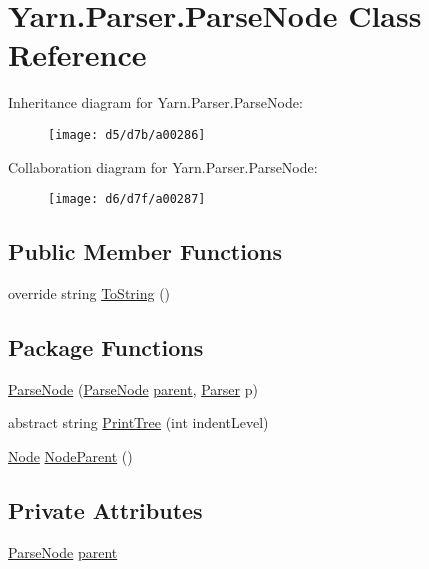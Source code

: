 \hypertarget{a00063}{\section{Yarn.\-Parser.\-Parse\-Node Class Reference}
\label{a00063}
}


Inheritance diagram for Yarn.\-Parser.\-Parse\-Node\-:
\nopagebreak
\begin{figure}[H]
\begin{center}
\leavevmode
\texttt{[image: d5/d7b/a00286]}
\end{center}
\end{figure}


Collaboration diagram for Yarn.\-Parser.\-Parse\-Node\-:
\nopagebreak
\begin{figure}[H]
\begin{center}
\leavevmode
\texttt{[image: d6/d7f/a00287]}
\end{center}
\end{figure}
\subsection*{Public Member Functions}
\begin{DoxyCompactItemize}
\item 
override string \hyperlink{a00063_a18c67cb16090d0889bb9d6c8c6c565f8}{To\-String} ()
\end{DoxyCompactItemize}
\subsection*{Package Functions}
\begin{DoxyCompactItemize}
\item 
\hyperlink{a00063_a9e7e90bbaed268529230512e4b5a2f77}{Parse\-Node} (\hyperlink{a00063}{Parse\-Node} \hyperlink{a00063_af313a82103fcc2ff5a177dbb06b92f7b}{parent}, \hyperlink{a00064}{Parser} p)
\item 
abstract string \hyperlink{a00063_a0d6611653f20c2e4d90a97a96c657137}{Print\-Tree} (int indent\-Level)
\item 
\hyperlink{a00054}{Node} \hyperlink{a00063_a580e520a29444fc23ac3660cbe514a09}{Node\-Parent} ()
\end{DoxyCompactItemize}
\subsection*{Private Attributes}
\begin{DoxyCompactItemize}
\item 
\hyperlink{a00063}{Parse\-Node} \hyperlink{a00063_af313a82103fcc2ff5a177dbb06b92f7b}{parent}
\end{DoxyCompactItemize}



